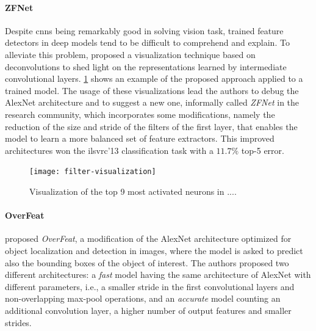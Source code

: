 \paragraph{ZFNet} Despite \glspl{cnn} being remarkably good in solving vision task,
trained feature detectors in deep models tend to be difficult to comprehend and explain.
To alleviate this problem, \citet{zeiler2014visualizing} proposed a visualization technique based on deconvolutions to shed light on the representations learned by intermediate convolutional layers.
\ref{fig:back:filter-visualization} shows an example of the proposed approach applied to a trained model.
The usage of these visualizations lead the authors to debug the AlexNet architecture and to suggest a new one, informally called \emph{ZFNet} in the research community, which incorporates some modifications, namely the reduction of the size and stride of the filters of the first layer, that enables the model to learn a more balanced set of feature extractors.
This improved architectures won the \gls{ilsvrc}'13 classification task with a $11.7 \%$ top-5 error.

\begin{figure}
    \centering
    \texttt{[image: filter-visualization]}
    \caption{Visualization of the top 9 most activated neurons in ....}
    \label{fig:back:filter-visualization}
\end{figure}

\paragraph{OverFeat} \citet{sermanet2013overfeat} proposed \emph{OverFeat}, a modification of the AlexNet architecture optimized for object localization and detection in images, where the model is asked to predict also the bounding boxes of the object of interest.
The authors proposed two different architectures: a \emph{fast} model having the same architecture of AlexNet with different parameters, i.e., a smaller stride in the first convolutional layers and non-overlapping max-pool operations, and an \emph{accurate} model counting an additional convolution layer, a higher number of output features and smaller strides.

